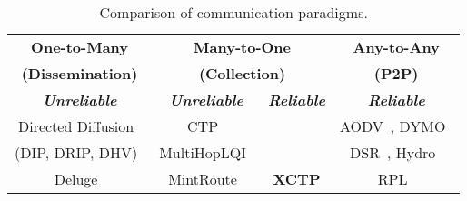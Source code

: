 \begin{table}[ht]
\centering

\caption{Comparison of communication paradigms.}
\label{tab:comp-paradigmas}


\begin{tabular}{|c|c|c|c|}
\hline \rowcolor[HTML]{cccccc}
\textbf{One-to-Many}       & \multicolumn{2}{c|}{\cellcolor[HTML]{cccccc}\textbf{Many-to-One}} & \textbf{Any-to-Any}              \\ \rowcolor[HTML]{cccccc}
\textbf{(Dissemination)}       & \multicolumn{2}{c|}{\cellcolor[HTML]{cccccc}\textbf{(Collection)}} & \textbf{(P2P)}      \\ \hline
\rowcolor[HTML]{cccccc}
\textit{\textbf{Unreliable}} & \textit{\textbf{Unreliable}}  & \textit{\textbf{Reliable}}       & \textit{\textbf{Reliable}} \\ \hline
Directed Diffusion~\cite{directedDiffusion}           & CTP~\cite{ctp}                          &                                  & AODV~\cite{AODV}, DYMO~\cite{dymo}                  \\ \cline{1-2} \cline{4-4}
(DIP, DRIP, DHV)~\cite{tinyos}               & MultiHopLQI~\cite{MultiHopLQI}                    &                                  & DSR~\cite{DSR}, Hydro~\cite{hydro}                      \\ \cline{1-2} \cline{4-4}
Deluge~\cite{deluge}                      & MintRoute~\cite{mintroute}                     & \multirow{-3}{*}{\textbf{XCTP}}  & RPL~\cite{RPL}                       \\ \hline
\end{tabular}


\end{table}




%
%
